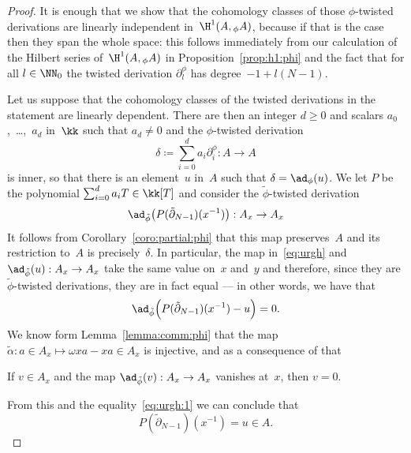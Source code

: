 \begin{proof}
It is enough that we show that the cohomology classes of those
$\phi$-twisted derivations are linearly independent in~$\H^1(A,{}_\phi A)$,
because if that is the case then they span the whole space: this follows
immediately from our calculation of the Hilbert series of~$\H^1(A,{}_\phi
A)$ in Proposition~\ref{prop:h1:phi} and the fact that for all $l\in\NN_0$
the twisted derivation $\partial^\phi_l$ has degree~$-1+l(N-1)$.

Let us suppose that the cohomology classes of the twisted derivations in
the statement are linearly dependent. There are then
an integer $d\geq0$ and scalars $a_0$,~\dots,~$a_d$ in~$\kk$
such that $a_d\neq0$ and the $\phi$-twisted derivation 
  \[
  \delta\coloneqq\sum_{i=0}^da_i\partial_i^\phi:A\to A
  \]
is inner, so that there is an element~$u$ in~$A$ such that
$\delta=\ad_\phi(u)$. We let $P$ be the polynomial
$\sum_{i=0}^da_iT\in\kk[T]$ and consider the $\tilde\phi$-twisted
derivation
  \[ \label{eq:urgh}
  \ad_{\tilde\phi}\bigl(P(\tilde\partial_{N-1})(x^{-1})\bigr):A_x\to A_x
  \]
It follows from Corollary~\ref{coro:partial:phi} that this map
preserves~$A$ and its restriction to~$A$ is precisely~$\delta$. In
particular, the map in~\eqref{eq:urgh} and~$\ad_{\tilde\phi}(u):A_x\to A_x$
take the same value on~$x$ and~$y$ and therefore, since they are
$\tilde\phi$-twisted derivations, they are in fact equal --- in other
words, we have that
  \[ \label{eq:urgh:1}
  \ad_{\tilde\phi}\Bigl(P(\tilde\partial_{N-1})(x^{-1})-u\Bigr) = 0.
  \]
We know form Lemma~\ref{lemma:comm:phi} that the map $\tilde\alpha:a\in
A_x\mapsto\omega xa-xa\in A_x$ is injective, and as a consequence of that

\begin{claim}\label{eq:urgh:2}
    If $v\in A_x$ and the map $\ad_{\tilde\phi}(v):A_x\to A_x$
  vanishes at~$x$, then $v=0$.
\end{claim}

From this and the equality~\eqref{eq:urgh:1} we can conclude that
  \[
  P(\tilde\partial_{N-1})(x^{-1}) = u \in A.
  \]


\end{proof}
